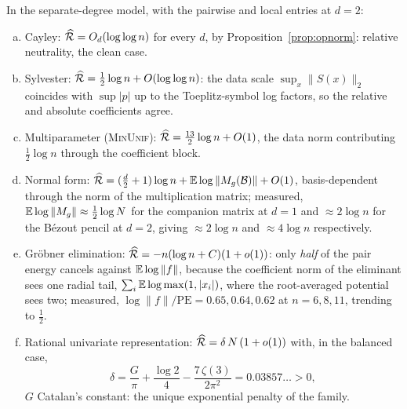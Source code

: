 \begin{proposition}\label{prop:scoreboard}
  In the separate-degree model, with the pairwise and local entries at $d=2$:
  \begin{enumerate}[(a)]
    \item Cayley: $\widehat{\mathcal{R}} = O_d(\log\log n)$ for every $d$, by
      Proposition~\ref{prop:opnorm}: relative neutrality, the clean case.
    \item Sylvester: $\widehat{\mathcal{R}} = \frac12\log n + O(\log\log n)$: the data scale
      $\sup_x\|S(x)\|_2$ coincides with $\sup|p|$ up to the Toeplitz-symbol log factors,
      so the relative and absolute coefficients agree.
    \item Multiparameter (\textsc{MinUnif}): $\widehat{\mathcal{R}} = \frac{13}2\log n + O(1)$, the
      data norm contributing $\frac12\log n$ through the coefficient block.
    \item Normal form:
      $\widehat{\mathcal{R}} = (\frac d2+1)\log n + \mathbb{E}\log\|M_g(\mathcal{B})\| + O(1)$, basis-dependent
      through the norm of the multiplication matrix; measured,
      $\mathbb{E}\log\|M_g\|\approx\frac12\log N$ for the companion matrix at $d=1$ and
      $\approx2\log n$ for the B\'ezout pencil at $d=2$, giving $\approx2\log n$ and
      $\approx4\log n$ respectively.
    \item Gr\"obner elimination: $\widehat{\mathcal{R}} = -n(\log n+C)(1+o(1))$: only \emph{half}
      of the pair energy cancels against $\mathbb{E}\log\|f\|$, because the coefficient norm of
      the eliminant sees one radial tail, $\sum_i\mathbb{E}\log\max(1,|x_i|)$, where the
      root-averaged potential sees two; measured,
      $\log\|f\|/\mathrm{PE} = 0.65, 0.64, 0.62$ at $n=6,8,11$, trending to $\frac12$.
    \item Rational univariate representation: $\widehat{\mathcal{R}} = \delta\,N\,(1+o(1))$ with,
      in the balanced case,
      \[
        \delta = \frac G\pi + \frac{\log2}4 - \frac{7\,\zeta(3)}{2\pi^2}
        = 0.03857\ldots > 0,
      \]
      $G$ Catalan's constant: the unique exponential penalty of the family.
  \end{enumerate}
\end{proposition}

